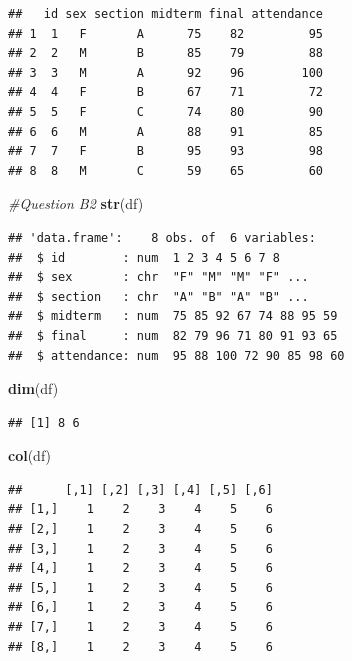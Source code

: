 \documentclass[
]{article}
\newenvironment{Shaded}{\begin{snugshade}}{\end{snugshade}}
\newcommand{\CommentTok}[1]{\textcolor[rgb]{0.56,0.35,0.01}{\textit{#1}}}
\newcommand{\FunctionTok}[1]{\textcolor[rgb]{0.13,0.29,0.53}{\textbf{#1}}}
\newcommand{\NormalTok}[1]{#1}
\begin{document}
\begin{verbatim}
##   id sex section midterm final attendance
## 1  1   F       A      75    82         95
## 2  2   M       B      85    79         88
## 3  3   M       A      92    96        100
## 4  4   F       B      67    71         72
## 5  5   F       C      74    80         90
## 6  6   M       A      88    91         85
## 7  7   F       B      95    93         98
## 8  8   M       C      59    65         60
\end{verbatim}

\begin{Shaded}
\begin{Highlighting}[]
\CommentTok{\#Question B2}
\FunctionTok{str}\NormalTok{(df)}
\end{Highlighting}
\end{Shaded}

\begin{verbatim}
## 'data.frame':    8 obs. of  6 variables:
##  $ id        : num  1 2 3 4 5 6 7 8
##  $ sex       : chr  "F" "M" "M" "F" ...
##  $ section   : chr  "A" "B" "A" "B" ...
##  $ midterm   : num  75 85 92 67 74 88 95 59
##  $ final     : num  82 79 96 71 80 91 93 65
##  $ attendance: num  95 88 100 72 90 85 98 60
\end{verbatim}

\begin{Shaded}
\begin{Highlighting}[]
\FunctionTok{dim}\NormalTok{(df)}
\end{Highlighting}
\end{Shaded}

\begin{verbatim}
## [1] 8 6
\end{verbatim}

\begin{Shaded}
\begin{Highlighting}[]
\FunctionTok{col}\NormalTok{(df)}
\end{Highlighting}
\end{Shaded}

\begin{verbatim}
##      [,1] [,2] [,3] [,4] [,5] [,6]
## [1,]    1    2    3    4    5    6
## [2,]    1    2    3    4    5    6
## [3,]    1    2    3    4    5    6
## [4,]    1    2    3    4    5    6
## [5,]    1    2    3    4    5    6
## [6,]    1    2    3    4    5    6
## [7,]    1    2    3    4    5    6
## [8,]    1    2    3    4    5    6
\end{verbatim}
\end{document}
